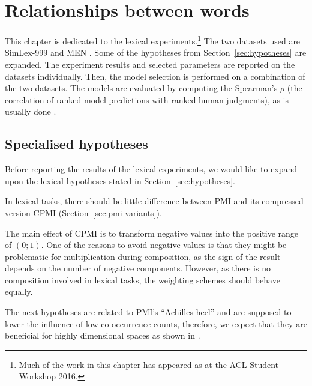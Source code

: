 \chapter{Relationships between words}
\label{sec:lexical}

This chapter is dedicated to the lexical experiments.\footnote{Much of the work in this chapter has appeared as  at the ACL Student Workshop 2016.} The two datasets used are  SimLex-999 \cite{hill2014simlex} and MEN \cite{Bruni:2014:MDS:2655713.2655714}. Some of the hypotheses from Section~\ref{sec:hypotheses} are expanded. The experiment results and selected parameters are reported on the datasets individually. Then, the model selection is performed on a combination of the two datasets. The models are evaluated by computing the Spearman's-$\rho$ (the correlation of ranked model predictions with ranked human judgments), as is usually done \cite{Bruni:2014:MDS:2655713.2655714,hill2014simlex}.\footnotemark{}


\section{Specialised hypotheses}
\label{sec:elab-hypoth-lexical}

Before reporting the results of the lexical experiments, we would like to expand upon the lexical hypotheses stated in Section~\ref{sec:hypotheses}.

\begin{hyp}
  \label{hyp:lex-pmi-cpmi}
  In lexical tasks, there should be little difference between PMI and its compressed version CPMI (Section~\ref{sec:pmi-variants}).
\end{hyp}

The main effect of CPMI is to transform negative values into the positive range of $(0; 1)$. One of the reasons to avoid negative values is that they might be problematic for multiplication during composition, as the sign of the result depends on the number of negative components. However, as there is no composition involved in lexical tasks, the weighting schemes should behave equally.

The next hypotheses are related to PMI's ``Achilles heel'' and are supposed to lower the influence of low co-occurrence counts, therefore, we expect that they are beneficial for highly dimensional spaces as shown in .

